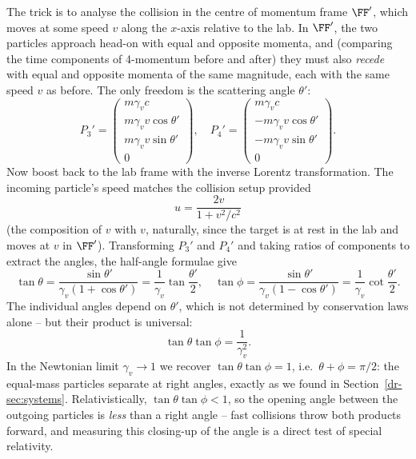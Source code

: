 The trick is to analyse the collision in the centre of momentum frame $\FF'$, which moves at some speed $v$ along the $x$-axis relative to the lab. In $\FF'$, the two particles approach head-on with equal and opposite momenta, and (comparing the time components of 4-momentum before and after) they must also \emph{recede} with equal and opposite momenta of the same magnitude, each with the same speed $v$ as before. The only freedom is the scattering angle $\theta'$:
$$
P_3' = \begin{pmatrix} m\gamma_v c \\ m \gamma_v v \cos\theta' \\ m \gamma_v v \sin \theta' \\ 0\end{pmatrix}, \quad P_4' = \begin{pmatrix} m\gamma_v c \\ -m \gamma_v v \cos\theta' \\ -m \gamma_v v \sin \theta' \\ 0\end{pmatrix}.
$$
Now boost back to the lab frame with the inverse Lorentz transformation. The incoming particle's speed matches the collision setup provided
$$
u = \frac{2v}{1 + v^2/c^2}
$$
(the composition of $v$ with $v$, naturally, since the target is at rest in the lab and moves at $v$ in $\FF'$). Transforming $P_3'$ and $P_4'$ and taking ratios of components to extract the angles, the half-angle formulae give
$$
\tan \theta = \frac{\sin\theta'}{\gamma_v (1 + \cos\theta')} = \frac{1}{\gamma_v} \tan \frac{\theta'}{2}, \quad
\tan \phi = \frac{\sin\theta'}{\gamma_v (1 - \cos\theta')} = \frac{1}{\gamma_v} \cot \frac{\theta'}{2}.
$$
The individual angles depend on $\theta'$, which is not determined by conservation laws alone -- but their product is universal:
$$
\tan\theta \tan\phi = \frac{1}{\gamma_v^2}.
$$
In the Newtonian limit $\gamma_v \to 1$ we recover $\tan\theta\tan\phi = 1$, i.e.\ $\theta + \phi = \pi/2$: the equal-mass particles separate at right angles, exactly as we found in Section~\ref{dr-sec:systems}. Relativistically, $\tan\theta\tan\phi < 1$, so the opening angle between the outgoing particles is \emph{less} than a right angle -- fast collisions throw both products forward, and measuring this closing-up of the angle is a direct test of special relativity.

